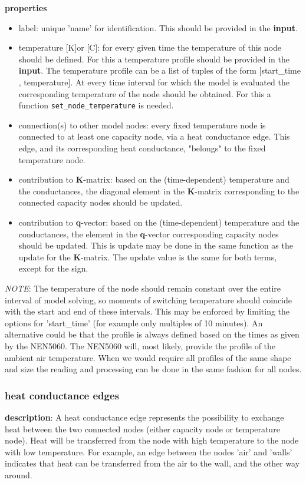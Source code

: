 \textbf{properties}
\begin{itemize}
	\item label: unique 'name' for identification. This should be provided in the \textbf{input}.
	\item temperature [K]or [\degree C]: for every given time the temperature of this node should be defined. For this a temperature profile should be provided in the \textbf{input}. The temperature profile can be a list of tuples of the form [start\_time , temperature]. At every time interval for which the model is evaluated the corresponding temperature of the node should be obtained. For this a function \texttt{set\_node\_temperature} is needed. 
	\item connection(s) to other model nodes: every fixed temperature node is connected to at least one capacity node, via a heat conductance edge. This edge, and its corresponding heat conductance, "belongs" to the fixed temperature node.
	\item contribution to \textbf{K}-matrix: based on the (time-dependent) temperature and the conductances, the diagonal element in the \textbf{K}-matrix corresponding to the connected capacity nodes should be updated.
	\item contribution to \textbf{q}-vector: based on the (time-dependent) temperature and the conductances, the element in the \textbf{q}-vector corresponding capacity nodes should be updated. This is update may be done in the same function as the update for the \textbf{K}-matrix. The update value is the same for both terms, except for the sign. 
\end{itemize}
\emph{NOTE}: The temperature of the node should remain constant over the entire interval of model solving, so moments of switching temperature should coincide with the start and end of these intervals. This may be enforced by limiting the options for 'start\_time' (for example only multiples of 10 minutes). An alternative could be that the profile is always defined based on the times as given by the NEN5060. The NEN5060 will, most likely, provide the profile of the ambient air temperature. When we would require all profiles of the same shape and size the reading and processing can be done in the same fashion for all nodes. 

\subsubsection{heat conductance edges}
\textbf{description}: A heat conductance edge represents the possibility to exchange heat between the two connected nodes (either capacity node or temperature node). Heat will be transferred from the node with high temperature to the node with low temperature. For example, an edge between the nodes 'air' and 'walls' indicates that heat can be transferred from the air to the wall, and the other way around.  

